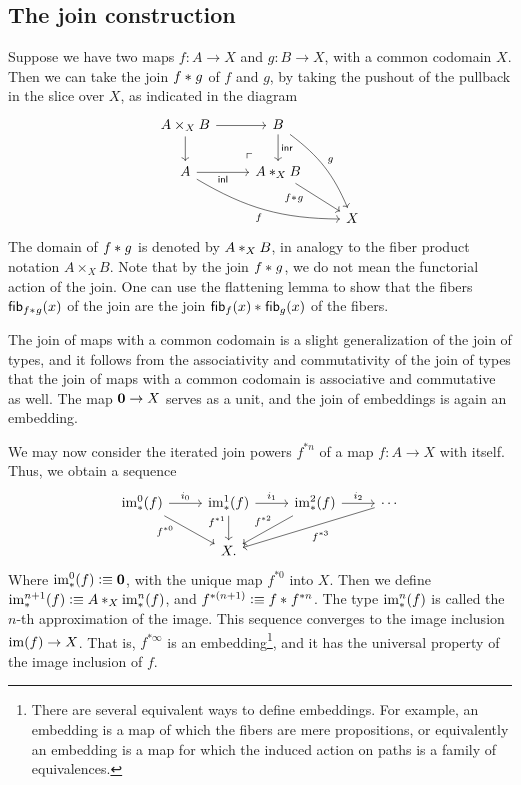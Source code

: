 \documentclass[reqno]{amsart}
\begin{document}
\subsection{The join construction}
Suppose we have two maps $f:A\to X$ and $g:B\to X$, with a common codomain $X$.
Then we can take the join $\join{f}{g}$ of $f$ and $g$, by taking the
pushout of the pullback in the slice over $X$, as indicated in the diagram
\begin{equation*}
\begin{tikzcd}
A\times_X B \arrow[r] \arrow[d] \arrow[dr,phantom,"\ulcorner" very near end] & B \arrow[ddr,bend left=15,"g"] \arrow[d,"\inr"] \\
A \arrow[r,swap,"\inl"] \arrow[drr,bend right=15,swap,"f"] & \join[X]{A}{B} \arrow[dr,swap,"\join{f}{g}" near start] \\
& & X
\end{tikzcd}
\end{equation*}
The domain of $\join{f}{g}$ is denoted by $\join[X]{A}{B}$, in analogy to the
fiber product notation $A\times_X B$. Note that by the join $\join{f}{g}$, we
do not mean the functorial action of the join. One can use the flattening lemma
to show that the fibers $\fib{\join{f}{g}}{x}$ of the join are the join
$\join{\fib{f}{x}}{\fib{g}{x}}$ of the fibers. 

The join of maps with a common codomain is a slight generalization of the join
of types, and it follows from the associativity and commutativity of the join
of types that the join of maps with a common codomain is associative and
commutative as well. The map $\emptyt\to X$ serves as a unit, and the
join of embeddings is again an embedding.

We may now consider the iterated join powers $f^{\ast n}$ of a map $f:A\to X$ with itself.
Thus, we obtain a sequence
\begin{equation*}
\begin{tikzcd}
\im_\ast^0(f) \arrow[dr,swap,near start,"f^{\ast 0}"] \arrow[r,"i_{0}"] & \im_\ast^1(f) \arrow[d,swap,near start,"f^{\ast 1}"] \arrow[r,"i_1"] & \im_\ast^2(f) \arrow[dl,swap,"f^{\ast 2}" xshift=.5em] \arrow[r,"i_2"] & \cdots \arrow[dll,"f^{\ast 3}"] \\
& X.
\end{tikzcd}
\end{equation*}
Where $\im_\ast^0(f)\defeq \emptyt$, with the unique map $f^{\ast 0}$ into $X$. Then we define $\im_\ast^{n+1}(f)\defeq \join[X]{A}{\im_\ast^n(f)}$, and
$f^{\ast(n+1)}\defeq \join{f}{f^{\ast n}}$. The type $\im_\ast^n(f)$ is called the $n$-th approximation of the image. This sequence converges to the image inclusion $\im(f)\to X$. That is, $f^{\ast\infty}$ is an embedding\footnote{There are several equivalent ways to define embeddings. For example, an embedding is a map of which the fibers are mere propositions, or equivalently an embedding is a map for which the induced action on paths is a family of equivalences.}, and it has the universal property of the image inclusion of $f$.
\end{document}
